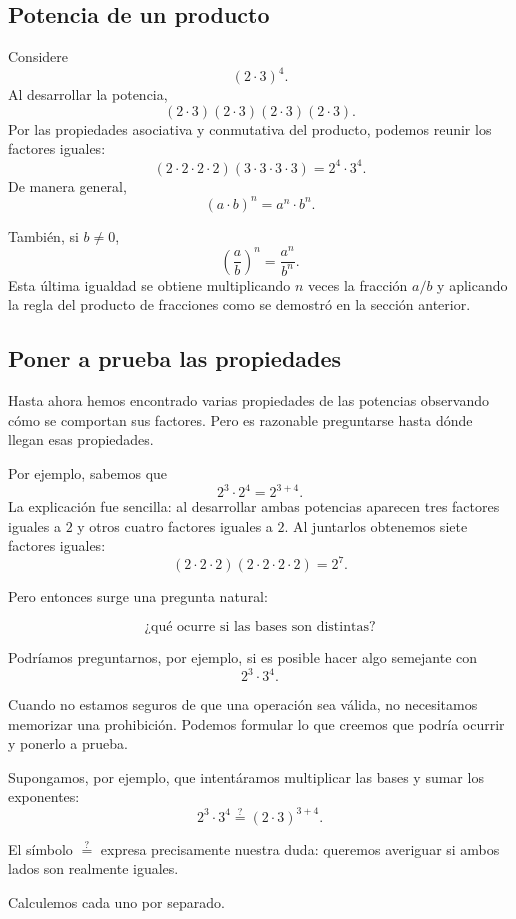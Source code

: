 \subsection{Potencia de un producto}

Considere
\[
(2\cdot3)^4.
\]
Al desarrollar la potencia,
\[
(2\cdot3)(2\cdot3)(2\cdot3)(2\cdot3).
\]
Por las propiedades asociativa y conmutativa del producto, podemos reunir los factores iguales:
\[
(2\cdot2\cdot2\cdot2)(3\cdot3\cdot3\cdot3)=2^4\cdot3^4.
\]
De manera general,
\[
(a\cdot b)^n=a^n\cdot b^n.
\]

También, si \(b\ne0\),
\[
\left(\frac ab\right)^n=\frac{a^n}{b^n}.
\]
Esta última igualdad se obtiene multiplicando \(n\) veces la fracción \(a/b\) y aplicando la regla del producto de fracciones como se demostró en la sección anterior.

\subsection{Poner a prueba las propiedades}

Hasta ahora hemos encontrado varias propiedades de las potencias observando cómo se comportan sus factores. Pero es razonable preguntarse hasta dónde llegan esas propiedades.

Por ejemplo, sabemos que
\[
2^3\cdot2^4=2^{3+4}.
\]
La explicación fue sencilla: al desarrollar ambas potencias aparecen tres factores iguales a \(2\) y otros cuatro factores iguales a \(2\). Al juntarlos obtenemos siete factores iguales:
\[
(2\cdot2\cdot2)(2\cdot2\cdot2\cdot2)
=
2^7.
\]

Pero entonces surge una pregunta natural:

\[
\text{¿qué ocurre si las bases son distintas?}
\]

Podríamos preguntarnos, por ejemplo, si es posible hacer algo semejante con
\[
2^3\cdot3^4.
\]

Cuando no estamos seguros de que una operación sea válida, no necesitamos memorizar una prohibición. Podemos formular lo que creemos que podría ocurrir y ponerlo a prueba.

Supongamos, por ejemplo, que intentáramos multiplicar las bases y sumar los exponentes:
\[
2^3\cdot3^4
\stackrel{?}{=}
(2\cdot3)^{3+4}.
\]

El símbolo \(\stackrel{?}{=}\) expresa precisamente nuestra duda: queremos averiguar si ambos lados son realmente iguales.

Calculemos cada uno por separado.

